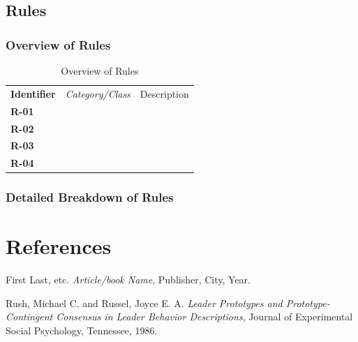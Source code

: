 \documentclass[12pt,letterpaper]{article}
\begin{document}
\subsection{Rules}
\subsubsection{Overview of Rules}

\begin{table}[H]
	\caption{Overview of Rules}
	\begin{tabu} to 
	    \tableheader{}Identifier & Category/Class & Description\\
		R-01 &  & \\
		R-02 &  & \\
		R-03 &  & \\
		R-04 &  & \\
	\end{tabu}
\end{table}

\subsubsection{Detailed Breakdown of Rules}

\renewcommand\refname{\vskip -1cm}
\section{References}

\begin{thebibliography}{16}

First Last, etc.
{\it Article/book Name},
Publisher, City, Year.

Rush, Michael C. and Russel, Joyce E. A.
{\it Leader Prototypes and Prototype-Contingent Consensus in Leader Behavior Descriptions},
Journal of Experimental Social Psychology, Tennessee, 1986.

\end{thebibliography}
\end{document}
